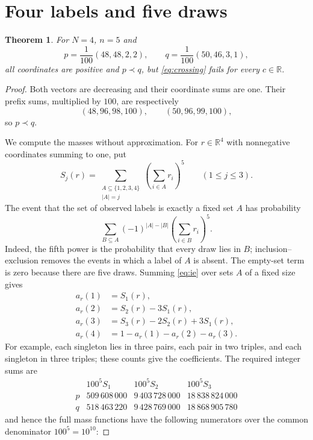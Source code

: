 \documentclass[11pt,a4paper]{article}
\newtheorem{theorem}{Theorem}
\begin{document}
\section{Four labels and five draws}
\begin{theorem}\label{thm:counterexample}
For $N=4$, $n=5$ and
\[
 p=\frac1{100}(48,48,2,2),\qquad
 q=\frac1{100}(50,46,3,1),
\]
all coordinates are positive and $p\prec q$, but
\eqref{eq:crossing} fails for every $c\in\mathbb R$.
\end{theorem}
\begin{proof}
Both vectors are decreasing and their coordinate sums are one. Their
prefix sums, multiplied by $100$, are respectively
\[
 (48,96,98,100),\qquad(50,96,99,100),
\]
so $p\prec q$.

We compute the masses without approximation. For $r\in\mathbb R^4$ with
nonnegative coordinates summing to one, put
\[
 S_j(r)=\sum_{\substack{A\subseteq\{1,2,3,4\}\\|A|=j}}
              \left(\sum_{i\in A}r_i\right)^5
 \qquad(1\leq j\leq3).
\]
The event that the set of observed labels is exactly a fixed set $A$
has probability
\begin{equation}\label{eq:ie}
 \sum_{B\subseteq A}(-1)^{|A|-|B|}
                 \left(\sum_{i\in B}r_i\right)^5.
\end{equation}
Indeed, the fifth power is the probability that every draw lies in $B$;
inclusion--exclusion removes the events in which a label of $A$ is absent.
The empty-set term is zero because there are five draws. Summing
\eqref{eq:ie} over sets $A$ of a fixed size gives
\begin{align*}
 a_r(1)&=S_1(r),\\
 a_r(2)&=S_2(r)-3S_1(r),\\
 a_r(3)&=S_3(r)-2S_2(r)+3S_1(r),\\
 a_r(4)&=1-a_r(1)-a_r(2)-a_r(3).
\end{align*}
For example, each singleton lies in three pairs, each pair in two triples,
and each singleton in three triples; these counts give the coefficients.
The required integer sums are
\[
\begin{array}{c|rrr}
 &100^5S_1&100^5S_2&100^5S_3\\\hline
 p&509\,608\,000&9\,403\,728\,000&18\,838\,824\,000\\
 q&518\,463\,220&9\,428\,769\,000&18\,868\,905\,780
\end{array}
\]
and hence the full mass functions have the following numerators over the
common denominator $100^5=10^{10}$:

\end{proof}
\end{document}
